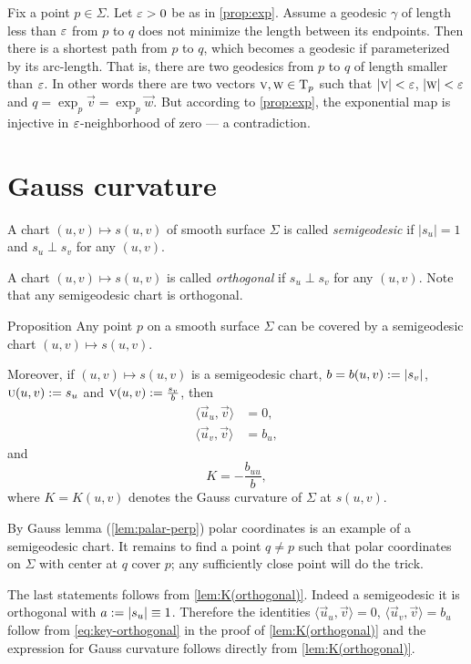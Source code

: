 Fix a point $p\in\Sigma$.
Let $\varepsilon>0$ be as in \ref{prop:exp}.
Assume a geodesic $\gamma$ of length less than $\varepsilon$ from $p$ to $q$ does not minimize the length between its endpoints.
Then there is a shortest path from $p$ to $q$, which becomes a geodesic if parameterized by its arc-length.
That is, there are two geodesics from $p$ to $q$ of length smaller than $\varepsilon$.
In other words there are two vectors ${\textsc v},\textsc w\in\mathrm{T}_p$ such that $|{\textsc v}|<\varepsilon$, $|\textsc w|<\varepsilon$ and 
$q=\exp_p\vec v=\exp_p\vec w$.
But according to \ref{prop:exp}, the exponential map is injective in $\varepsilon$-neighborhood of zero --- a contradiction.\qeds

\section{Gauss curvature}

A chart $(u,v)\mapsto s(u,v)$ of smooth surface $\Sigma$ is called \emph{semigeodesic} if $|s_u|=1$ and $s_u\perp s_v$ for any $(u,v)$.

A chart $(u,v)\mapsto s(u,v)$ is called \emph{orthogonal} if $s_u\perp s_v$ for any $(u,v)$.
Note that any semigeodesic chart is orthogonal.

\begin{thm}{Proposition}\label{prop:K(semigeodesic)}
Any point $p$ on a smooth surface $\Sigma$ can be covered by a semigeodesic chart $(u,v)\mapsto s(u,v)$.

Moreover, if $(u,v)\mapsto s(u,v)$ is a semigeodesic chart, 
$b=b(u,v)\z\df|s_v|$,
$\textsc u(u,v):= s_u$
and 
$\textsc v(u,v):=\tfrac{s_v}b$,
then 
\begin{align*}
\langle\vec u_u,\vec v\rangle&=0,
\\
\langle\vec u_v,\vec v\rangle&=b_u,
\end{align*}
and 
\[K=-\frac{b_{uu}}b,\]
where $K=K(u,v)$ denotes the Gauss curvature of $\Sigma$ at $s(u,v)$.

\end{thm}

By Gauss lemma (\ref{lem:palar-perp}) polar coordinates is an example of a semigeodesic chart.
It remains to find a point $q\ne p$ such that polar coordinates on $\Sigma$ with center at $q$ cover $p$;
any sufficiently close point will do the trick.

The last statements follows from \ref{lem:K(orthogonal)}.
Indeed a semigeodesic it is orthogonal with $a:=|s_u|\equiv1$.
Therefore the identities $\langle\vec u_u,\vec v\rangle=0$,
$\langle\vec u_v,\vec v\rangle=b_u$ follow from \ref{eq:key-orthogonal} in the proof of \ref{lem:K(orthogonal)}
and the expression for Gauss curvature follows directly from \ref{lem:K(orthogonal)}.
\qeds

